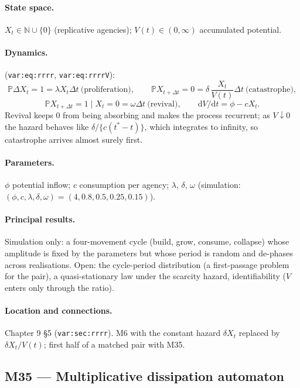 \documentclass[11pt,a4paper]{article}
\newcommand{\PR}{\mathbb{P}}
\newcommand{\dd}{\mathrm{d}}
\begin{document}
\paragraph{State space.} $X_t\in\mathbb N\cup\{0\}$ (replicative
agencies); $V(t)\in(0,\infty)$ accumulated potential.

\paragraph{Dynamics.} (\texttt{var:eq:rrrr}, \texttt{var:eq:rrrrV}):
\[
\PR{\Delta X_t=1}=\lambda X_t\Delta t \ \text{(proliferation)},\qquad
\PR{X_{t+\Delta t}=0}=\delta\,\frac{X_t}{V(t)}\Delta t \ \text{(catastrophe)},
\]
\[
\PR{X_{t+\Delta t}=1\mid X_t=0}=\omega\Delta t \ \text{(revival)},\qquad
\dd V/\dd t=\phi-cX_t .
\]
Revival keeps $0$ from being absorbing and makes the process recurrent; as
$V\downarrow0$ the hazard behaves like $\delta/\{c(t^*-t)\}$, which
integrates to infinity, so catastrophe arrives almost surely first.

\paragraph{Parameters.} $\phi$ potential inflow; $c$ consumption per
agency; $\lambda$, $\delta$, $\omega$ (simulation:
$(\phi,c,\lambda,\delta,\omega)=(4,0.8,0.5,0.25,0.15)$).

\paragraph{Principal results.} Simulation only: a four-movement cycle
(build, grow, consume, collapse) whose amplitude is fixed by the parameters
but whose period is random and de-phases across realisations. Open: the
cycle-period distribution (a first-passage problem for the pair), a
quasi-stationary law under the scarcity hazard, identifiability ($V$ enters
only through the ratio).

\paragraph{Location and connections.} Chapter 9 \S5
(\texttt{var:sec:rrrr}). M6 with the constant hazard $\delta X_t$ replaced
by $\delta X_t/V(t)$; first half of a matched pair with M35.

\subsection{M35 --- Multiplicative dissipation automaton}
\end{document}

